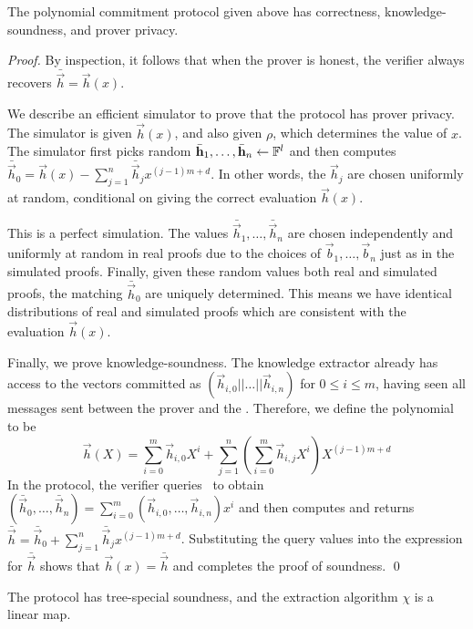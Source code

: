 \begin{lemma} \label{proofpolycommit}
The polynomial commitment protocol given above has correctness, knowledge-soundness, and prover privacy.
\end{lemma}
\begin{proof}
By inspection, it follows that when the prover is honest, the verifier always recovers $\bar{\vec{h}}=\vec{h}(x)$. 

We describe an efficient simulator to prove that the protocol has prover privacy. The simulator is given $\vec{h}(x)$, and also given $\rho$, which determines the value of $x$. The simulator first picks random $\bar{\mathbf{h}}_1,\ldots,\bar{\mathbf{h}}_n\gets \mathbb{F}^l$ and then computes $\bar{\vec{h}}_0=\vec{h}(x)-\sum_{j=1}^n\bar{\vec{h}}_jx^{(j-1)m+d}$. In other words, the $\vec{h}_j$ are chosen uniformly at random, conditional on giving the correct evaluation $\vec{h}(x)$.

This is a perfect simulation. The values $\bar{\vec{h}}_1,\ldots,\bar{\vec{h}}_n$ are chosen independently and uniformly at random in real proofs due to the choices of $\vec{b}_1,\ldots,\vec{b}_n$ just as in the simulated proofs. Finally, given these random values both real and simulated proofs, the matching $\bar{\vec{h}}_0$ are uniquely determined. This means we have identical distributions of real and simulated proofs which are consistent with the evaluation $\vec{h}(x)$.

Finally, we prove knowledge-soundness. The knowledge extractor already has access to the vectors committed as $(\vec{h}_{i,0}||\ldots||\vec{h}_{i,n})$ for $0 \leq i \leq m$, having seen all messages sent between the prover and the \ILC. Therefore, we define the polynomial to be $$\vec{h}(X)=\sum_{i=0}^m\vec{h}_{i,0}X^i +\sum_{j=1}^{n} \left(\sum_{i=0}^m\vec{h}_{i,j}X^i \right)X^{(j-1)m+d}$$
In the protocol, the verifier queries \ILC\ to obtain $(\bar{\vec{h}}_0,\ldots,\bar{\vec{h}}_n) = \sum_{i=0}^{m} (\vec{h}_{i,0},\ldots,\vec{h}_{i,n}) x^i$ and then computes and returns $\bar{\vec{h}} = \bar{\vec{h}}_0+\sum_{j=1}^{n} \bar{\vec{h}}_{j} x^{(j-1)m+d}$. Substituting the query values into the expression for $\bar{\vec{h}}$ shows that $\vec{h}(x) = \bar{\vec{h}}$ and completes the proof of soundness. \qed
\end{proof}

\begin{lemma}
The protocol has tree-special soundness, and the extraction algorithm $\chi$ is a linear map.
\end{lemma}

